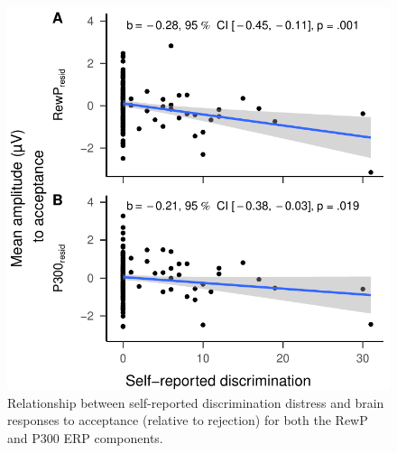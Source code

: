 \documentclass[
  man,floatsintext]{apa7}
\begin{document}
\begin{figure}
\centering
\includegraphics{BUDS_tables_and_figures_working_alternative_electrodes_files/figure-latex/unnamed-chunk-18-1.pdf}
\caption{\label{fig:unnamed-chunk-18}Relationship between self-reported discrimination distress and brain responses to acceptance (relative to rejection) for both the RewP and P300 ERP components.}
\end{figure}
\end{document}
